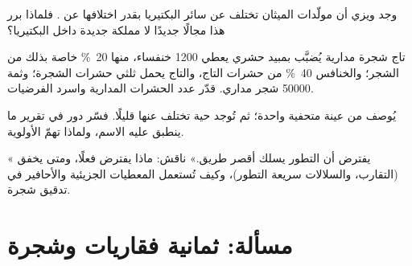 \begin{exercise}[$\star\star$]\label{exo:b1:classifying-biodiversity:9}
وجد ويزي أن مولّدات الميثان تختلف عن سائر البكتيريا بقدر
اختلافها عن . فلماذا برر هذا مجالًا جديدًا لا مملكة
جديدة داخل البكتيريا؟
\end{exercise}

\begin{exercise}[$\star\star\star$]\label{exo:b1:classifying-biodiversity:10}
تاج شجرة مدارية يُضبَّب بمبيد حشري يعطي 1200 
خنفساء، منها \qty{20}{\%} خاصة بذلك  من الشجر؛
والخنافس \qty{40}{\%} من حشرات التاج، والتاج
يحمل ثلثي حشرات الشجرة؛ وثمة \num{50000}
 شجر مداري. قدّر عدد  الحشرات المدارية
واسرد الفرضيات.
\end{exercise}

\begin{exercise}[$\star\star\star$]\label{exo:b1:classifying-biodiversity:11}
يُوصف  من عينة متحفية واحدة؛ ثم تُوجد 
حية تختلف عنها قليلًا. فسّر دور  في
تقرير ما ينطبق عليه الاسم، ولماذا تهمّ الأولوية.
\end{exercise}

\begin{exercise}[$\star\star\star$]\label{exo:b1:classifying-biodiversity:12}
« يفترض أن التطور يسلك أقصر طريق.» ناقش:
ماذا يفترض  فعلًا، ومتى يخفق (التقارب، والسلالات سريعة
التطور)، وكيف تُستعمل المعطيات الجزيئية والأحافير في تدقيق
شجرة.
\end{exercise}

\section{مسألة: ثمانية فقاريات وشجرة}

